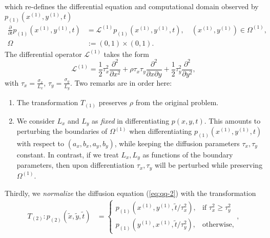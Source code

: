 which re-defines the differential equation and computational domain observed by
$p_{(1)}(x^{(1)}, y^{(1)}, t)$
\begin{align}
  \frac{\partial}{\partial t}p_{(1)}(x^{(1)}, y^{(1)}, t) &= \mathcal{L}^{(1)}p_{(1)}(x^{(1)}, y^{(1)}, t),\quad (x^{(1)},y^{(1)}) \in \Omega^{(1)}, \label{eq:qq-2} \\
  \Omega &:= (0,1) \times (0,1). \nonumber
\end{align}
The differential operator $\mathcal{L}^{(1)}$ takes the form
\[
  \mathcal{L}^{(1)} = \frac{1}{2} \tau_x^2 \frac{\partial^2}{\partial x^2}
  + \rho\tau_x\tau_y \frac{\partial^2}{\partial x \partial y} + \frac{1}{2}\tau_y^2 \frac{\partial^2}{\partial y^2},
\]
with $\tau_x = \frac{\sigma_x}{L_x}$,
$\tau_y = \frac{\sigma_y}{L_y}$.  Two remarks are in order here:
\begin{enumerate}
\item The transformation $T_{(1)}$ preserves $\rho$ from the original
  problem.
\item We consider $L_x$ and $L_y$ as \textit{fixed} in differentiating
  $p(x,y,t)$. This amounts to perturbing the boundaries of
  $\Omega^{(1)}$ when differentiating $p_{(1)}(x^{(1)}, y^{(1)}, t)$
  with respect to $(a_x, b_x, a_y, b_y)$, while keeping the diffusion
  parameters $\tau_x, \tau_y$ constant. In contrast, if we treat
  $L_x, L_y$ as functions of the boundary parameters, then upon
  differentiation $\tau_x, \tau_y$ will be perturbed while preserving
  $\Omega^{(1)}$.
\end{enumerate}
Thirdly, we \textit{normalize} the diffusion equation (\ref{eq:qq-2}) with the transformation
\begin{align}
  T_{(2)}: p_{(2)}(\tilde{x}, \tilde{y}, \tilde{t}) &= \left\{ \begin{array}{cc}
                                                  p_{(1)}(x^{(1)}, y^{(1)}, \tilde{t}/\tau_x^2), &\mbox{if } \tau_x^2 \geq \tau_y^2 \\
                                                 p_{(1)}(y^{(1)}, x^{(1)}, \tilde{t}/\tau_y^2), &\mbox{otherwise},
                                                  \end{array} \right., \label{eq:T2}
\end{align}
